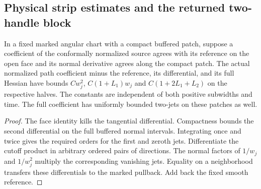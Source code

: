 \subsection{Physical strip estimates and the returned two-handle block}
\label{sec:ed04-disk-pair}

\begin{proposition}
\label{prop:ed45-jets}
\leanok
In a fixed marked angular chart with a compact buffered patch, suppose a
coefficient of the conformally normalized source agrees with its reference
on the open face and its normal derivative agrees along the compact patch.
The actual normalized path coefficient minus the reference, its differential,
and its full Hessian have bounds $Cw_j^2$, $C(1+L_1)w_j$ and
$C(1+2L_1+L_2)$ on the respective halves. The constants are independent
of both positive subwidths and time. The full coefficient has uniformly
bounded two-jets on these patches as well.
\end{proposition}
\begin{proof}
\leanok
The face identity kills the tangential differential. Compactness bounds the
second differential on the full buffered normal intervals. Integrating
once and twice gives the required orders for the first and zeroth jets.
Differentiate the cutoff product in arbitrary ordered pairs of directions.
The normal factors of $1/w_j$ and $1/w_j^2$ multiply the corresponding
vanishing jets. Equality on a neighborhood transfers these differentials
to the marked pullback. Add back the fixed smooth reference.
\end{proof}

